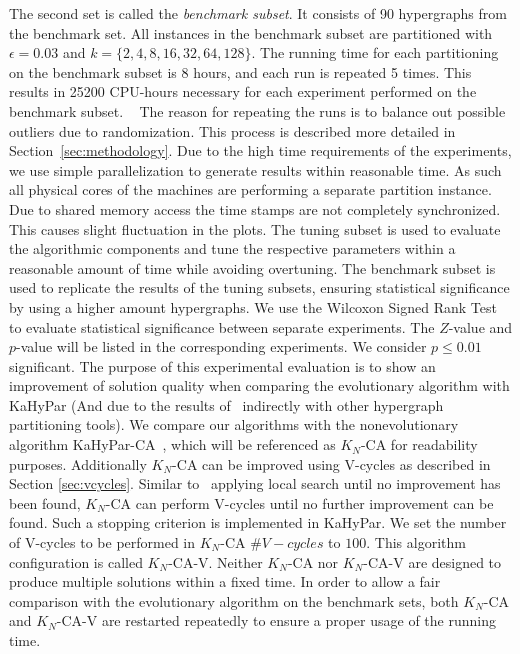 \documentclass[a4paper,12pt,titlepage, BCOR7mm,headsepline]{scrbook}
\numberwithin{equation}{section}
\begin{document}
The second set is called the \emph{benchmark subset}. It consists of 90 hypergraphs from the benchmark set. All instances in the benchmark subset are partitioned with $\epsilon = 0.03$ and $k = \{2,4,8,16,32,64,128\}$. The running time for each partitioning on the benchmark subset is 8 hours, and each run is repeated 5 times. This results in 25200 CPU-hours necessary for each experiment performed on the benchmark subset.
\newline ~ \newline
The reason for repeating the runs is to balance out possible outliers due to randomization. This process is described more detailed in Section~\ref{sec:methodology}.
Due to the high time requirements of the experiments, we use simple parallelization to generate results within reasonable time. As such all physical cores of the machines are performing a separate partition instance. Due to shared memory access the time stamps are not completely synchronized. This causes slight fluctuation in the plots. 
The tuning subset is used to evaluate the algorithmic components and tune the respective parameters within a reasonable amount of time while avoiding overtuning. 
The benchmark subset is used to replicate the results of the tuning subsets, ensuring statistical significance by using a higher amount hypergraphs. 
We use the Wilcoxon Signed Rank Test~\cite{wilcoxon1945individual} to evaluate statistical significance between separate experiments. The $Z$-value and $p$-value will be listed in the corresponding experiments. We consider $p \le 0.01$ significant.
The purpose of this experimental evaluation is to show an improvement of solution quality when comparing the evolutionary algorithm with KaHyPar (And due to the results of~\cite{akhremtsev2017engineering} indirectly with other hypergraph partitioning tools).
We compare our algorithms with the nonevolutionary algorithm KaHyPar-CA~\cite{heuer2017improving}, which will be referenced as $K_N$-CA for readability purposes.
Additionally $K_N$-CA can be improved using V-cycles as described in Section \ref{sec:vcycles}. Similar to~\cite{armstrong2010investigation} applying local search until no improvement has been found, $K_N$-CA can perform V-cycles until no further improvement can be found. Such a stopping criterion is implemented in KaHyPar. We set the number of V-cycles to be performed in $K_N$-CA $\#V-cycles$ to $100$. This algorithm configuration is called $K_N$-CA-V.
Neither $K_N$-CA nor $K_N$-CA-V are designed to produce multiple solutions within a fixed time. In order to allow a fair comparison with the evolutionary algorithm on the benchmark sets, both $K_N$-CA and $K_N$-CA-V are restarted repeatedly to ensure a proper usage of the running time.
\end{document}
